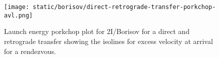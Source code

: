 \begin{figure}[H]
  \centering
  \texttt{[image: static/borisov/direct-retrograde-transfer-porkchop-avl.png]}
        \caption[Direct and retrograde arrival excess velocity porkchop for
        Borisov]{Launch energy porkchop plot for 2I/Borisov for a direct and
        retrograde transfer showing the isolines for excess velocity at arrival
        for a rendezvous.}
  \label{fig:borisov-direct-retrograde-transfer-porkchop-avl}
\end{figure}
